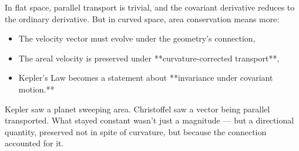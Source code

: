 In flat space, parallel transport is trivial, and the covariant derivative reduces to the ordinary derivative.  
But in curved space, area conservation means more:

\begin{itemize}
    \item The velocity vector must evolve under the geometry's connection,
    \item The areal velocity is preserved under **curvature-corrected transport**,
    \item Kepler’s Law becomes a statement about **invariance under covariant motion.**
\end{itemize}

\bigskip

\begin{tcolorbox}[colback=red!5!white, colframe=red!80!black, title=\textbf{Christoffel’s Take on Kepler}]
Kepler saw a planet sweeping area.  
Christoffel saw a vector being parallel transported.  
What stayed constant wasn’t just a magnitude —  
but a directional quantity, preserved not in spite of curvature,  
but because the connection accounted for it.
\end{tcolorbox}



